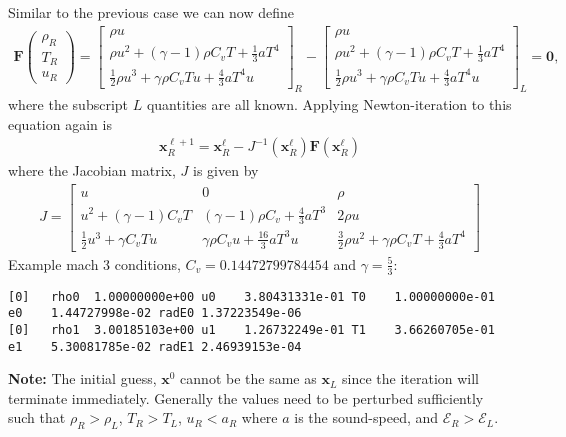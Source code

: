 \documentclass[10pt,letterpaper,notitlepage]{article}
\numberwithin{equation}{section}
\newcommand{\RadE}{\mathcal{E}}
\newcommand{\half}{\frac{1}{2}}
\newcommand{\beq}{\begin{equation*} \begin{aligned}}
\newcommand{\eeq}{\end{aligned}\end{equation*}}
\newcommand{\beqn}{\begin{equation}\begin{aligned}}
\newcommand{\eeqn}{\end{aligned}\end{equation}}
\begin{document}
\begin{appendices}
Similar to the previous case we can now define
\beqn 
\mathbf{F} 
\begin{pmatrix}
	\rho_R \\ T_R \\ u_R
\end{pmatrix}
=
\begin{bmatrix}
	\rho u \\
	\rho u^2   +  (\gamma-1) \rho C_v T 
	+\frac{1}{3} a T^4 \\
	\half \rho u^3 + \gamma \rho C_v T u + \frac{4}{3} a T^4 u  
\end{bmatrix}_R
-
\begin{bmatrix}
	\rho u \\
	\rho u^2   +  (\gamma-1) \rho C_v T 
	+\frac{1}{3} a T^4 \\
	\half \rho u^3 + \gamma \rho C_v T u + \frac{4}{3} a T^4 u  
\end{bmatrix}_L = \mathbf{0},
\eeqn 
where the subscript $L$ quantities are all known. Applying Newton-iteration to this equation again is 
\beq
\mathbf{x}_R^{\ell+1} = \mathbf{x}_R^\ell - J^{-1}(\mathbf{x}_R^\ell) \mathbf{F}(\mathbf{x}_R^\ell)
\eeq 
where the Jacobian matrix, $J$ is given by
\beqn 
J = 
\begin{bmatrix}
	u & 0 & \rho \\
	u^2 + (\gamma-1)C_v T & (\gamma-1)\rho C_v + \frac{4}{3}a T^3 & 2\rho u \\
	\half u^3 + \gamma C_v T u & \gamma \rho C_v u + \frac{16}{3} a T^3 u & \frac{3}{2} \rho u^2 + \gamma \rho C_v T + \frac{4}{3} a T^4 
\end{bmatrix}
\eeqn 
Example mach 3 conditions, $C_v = 0.14472799784454$ and $\gamma = \frac{5}{3}$:
{\smaller
\begin{verbatim}
[0]   rho0  1.00000000e+00 u0    3.80431331e-01 T0    1.00000000e-01 e0    1.44727998e-02 radE0 1.37223549e-06
[0]   rho1  3.00185103e+00 u1    1.26732249e-01 T1    3.66260705e-01 e1    5.30081785e-02 radE1 2.46939153e-04
\end{verbatim}
}
\vspace{1cm}
\noindent
\textbf{Note:} The initial guess, $\mathbf{x}^0$ cannot be the same as $\mathbf{x}_L$ since the iteration will terminate immediately. Generally the values need to be perturbed sufficiently such that $\rho_R > \rho_L$, $T_R > T_L$, $u_R < a_R$ where $a$ is the sound-speed, and $\RadE_R > \RadE_L$.








\end{appendices}
\end{document}
